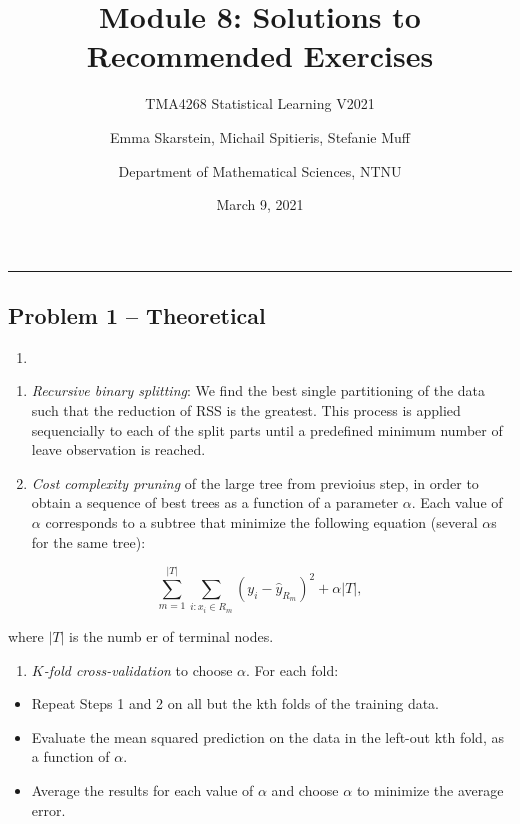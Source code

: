 \documentclass[]{article}
\title{Module 8: Solutions to Recommended Exercises}
\subtitle{TMA4268 Statistical Learning V2021}
\author{Emma Skarstein, Michail Spitieris, Stefanie Muff \and Department of Mathematical Sciences, NTNU}
\date{March 9, 2021}
\providecommand{\tightlist}{%
  \setlength{\itemsep}{0pt}\setlength{\parskip}{0pt}}
\begin{document}
\maketitle

\begin{center}\rule{0.5\linewidth}{0.5pt}\end{center}

\hypertarget{problem-1-theoretical}{%
\subsection{Problem 1 -- Theoretical}\label{problem-1-theoretical}}

\begin{enumerate}
\def\labelenumi{\alph{enumi})}
\item
\end{enumerate}

\begin{enumerate}
\def\labelenumi{\arabic{enumi}.}
\item
  \emph{Recursive binary splitting}: We find the best single
  partitioning of the data such that the reduction of RSS is the
  greatest. This process is applied sequencially to each of the split
  parts until a predefined minimum number of leave observation is
  reached.
\item
  \emph{Cost complexity pruning} of the large tree from previoius step,
  in order to obtain a sequence of best trees as a function of a
  parameter \(\alpha\). Each value of \(\alpha\) corresponds to a
  subtree that minimize the following equation (several \(\alpha\)s for
  the same tree):
\end{enumerate}

\[\sum_{m=1}^{|T|}\sum_{i:x_i\in R_m}(y_i - \hat y_{R_m})^2 + \alpha |T|,\]

where \(|T|\) is the numb er of terminal nodes.

\begin{enumerate}
\def\labelenumi{\arabic{enumi}.}
\setcounter{enumi}{2}
\tightlist
\item
  \emph{\(K\)-fold cross-validation} to choose \(\alpha\). For each
  fold:
\end{enumerate}

\begin{itemize}
\tightlist
\item
  Repeat Steps 1 and 2 on all but the kth folds of the training data.
\item
  Evaluate the mean squared prediction on the data in the left-out kth
  fold, as a function of \(\alpha\).
\item
  Average the results for each value of \(\alpha\) and choose \(\alpha\)
  to minimize the average error.
\end{itemize}
\end{document}
